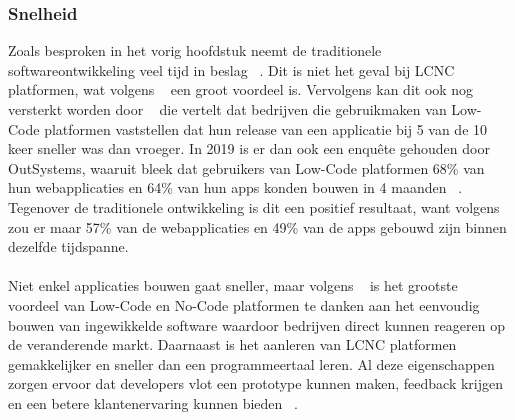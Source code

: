 \subsubsection{Snelheid}
\label{subsec:snelheid}
Zoals besproken in het vorig hoofdstuk neemt de traditionele softwareontwikkeling veel tijd in beslag ~\autocite{Moskal_2021}. 
Dit is niet het geval bij LCNC platformen, wat volgens ~\textcite{Adrian_2020} een groot voordeel is. 
Vervolgens kan dit ook nog versterkt worden door ~\textcite{Yan2021} die vertelt dat bedrijven die gebruikmaken van 
Low-Code platformen vaststellen dat hun release van een applicatie bij 5 van de 10 keer sneller was dan vroeger. In 2019 is er dan ook een enquête gehouden door OutSystems, 
waaruit bleek dat gebruikers van Low-Code platformen 68\% van hun webapplicaties en 64\% van hun apps konden bouwen in 4 maanden ~\autocite{Yan2021}. 
Tegenover de traditionele ontwikkeling is dit een positief resultaat, want volgens ~\textcite{Yan2021} zou er maar 57\% van de webapplicaties en 49\% van de apps gebouwd zijn binnen dezelfde tijdspanne.
\\
\\
Niet enkel applicaties bouwen gaat sneller, maar volgens ~\textcite{da_Cruz_2021} is het grootste voordeel van Low-Code en No-Code platformen 
te danken aan het eenvoudig bouwen van ingewikkelde software waardoor bedrijven direct kunnen reageren op de veranderende markt. 
Daarnaast is het aanleren van LCNC platformen gemakkelijker en sneller dan een programmeertaal leren. 
Al deze eigenschappen zorgen ervoor dat developers vlot een prototype kunnen maken, feedback krijgen en een betere klantenervaring kunnen bieden ~\autocite{da_Cruz_2021}.
